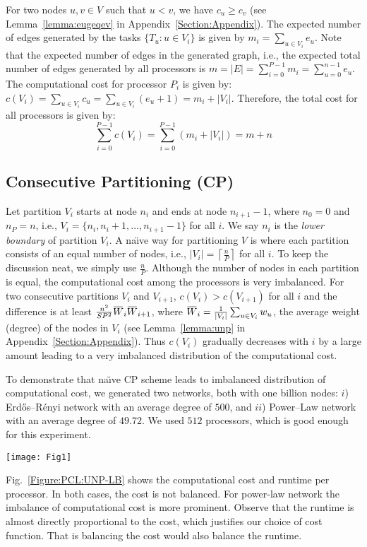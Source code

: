 \documentclass[conference,letterpaper,10pt]{IEEEtran}
\newcommand{\Figure}{Fig.\xspace}
\newcommand{\overbar}[1]{\mkern 1.5mu\overline{\mkern-1.5mu#1\mkern-1.5mu}\mkern 1.5mu}
\begin{document}
For two nodes $u,v\in V$ such that $u<v$, we have $c_{u} \geq c_{v}$ (see Lemma~\ref{lemma:eugeqev} in Appendix~\ref{Section:Appendix}). The expected number of edges generated by the tasks $\{T_u : u \in V_i\}$ is given by $m_{i}=\sum_{u \in V_{i}}e_{u}$. Note that the expected number of edges in the generated graph, i.e., the expected total number of edges generated by all processors is $m=|E|=\sum_{i=0}^{P-1} m_{i}= \sum_{u=0}^{n-1}e_{u}$.
The computational cost for processor $P_i$ is given by:
$\textstyle c(V_i) = \sum_{u \in V_{i}}c_{u} = \sum_{u \in V_{i}} (e_{u}+1) = m_i + |V_i|.
\label{Equation:PCL:pcost}
$
Therefore, the total cost for all processors is given by:
\begin{equation}
\textstyle
\sum_{i=0}^{P-1} c(V_i) = \sum_{i=0}^{P-1} \left( m_i + |V_i| \right) = m + n
\label{Equation:PCL:totalcost}
\end{equation}

\subsection{Consecutive Partitioning (CP)}
\label{Section:PCL:consecutive-partitioning}
Let partition $V_i$ starts at node $n_i$ and ends at node $n_{i+1}-1$, where $n_0=0$ and $n_P=n$, i.e., $V_i=\{n_i,n_i+1, \ldots,n_{i+1}-1 \}$ for all $i$. We say $n_{i}$ is the \textit{lower boundary} of partition $V_{i}$.  
A na\"{\i}ve way for partitioning $V$ is where each partition consists of an equal number of nodes, i.e., $|V_i|=\left\lceil\frac{n}{P}\right\rceil$ for all $i$. To keep the discussion neat, we simply use $\frac{n}{P}$. 
Although the number of nodes in each partition is equal, the computational cost among the processors is very imbalanced. For two consecutive partitions $V_i$ and $V_{i+1}$, $c(V_i) > c(V_{i+1})$ for all $i$ and the difference is at least $\frac{n^2}{SP^2} \overbar{W}_{i}\overbar{W}_{i+1}$, where $\overbar{W}_{i} = \frac{1}{|V_i|}\sum_{u\in V_i}{w_u}$, the average weight (degree) of the nodes in $V_i$ (see  Lemma~\ref{lemma:unp} in Appendix~\ref{Section:Appendix}). Thus $c(V_i)$ gradually decreases with $i$ by a large amount leading to a very imbalanced distribution of the computational cost. 

To demonstrate that na\"{\i}ve CP scheme leads to imbalanced distribution of computational cost, we generated two networks, both with one billion nodes: $i$) Erd\H{o}s--R\'enyi network with an average degree of $500$, and $ii$) Power--Law network with an average degree of $49.72$. We used $512$ processors, which is good enough for this experiment.
\begin{figure*}[t]
\centering
{\texttt{[image: Fig1]}}
\caption{Computational cost and runtime in na\"{\i}ve CP scheme}
\label{Figure:PCL:UNP-LB}
\end{figure*}
\Figure~\ref{Figure:PCL:UNP-LB} shows the computational cost and runtime per processor. In both cases, the cost is not balanced. For power-law network the imbalance of computational cost is more prominent. Observe that the runtime is almost directly proportional to the cost, which justifies our choice of cost function. That is balancing the cost would also balance the runtime.
\end{document}
